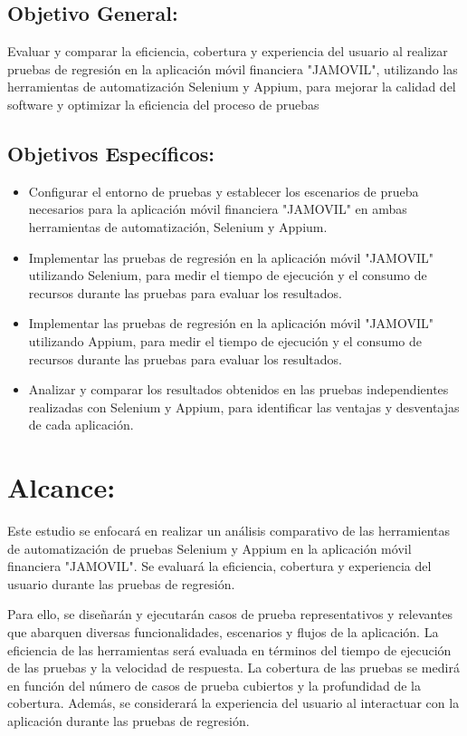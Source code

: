 \documentclass{article}
\begin{document}
\subsection*{Objetivo General:}
 Evaluar y comparar la eficiencia, cobertura y experiencia del usuario al realizar pruebas de regresión en la aplicación móvil financiera "JAMOVIL", utilizando las herramientas de automatización Selenium y Appium, para mejorar la calidad del software y optimizar la eficiencia del proceso de pruebas
\subsection*{Objetivos Específicos:}

\begin{itemize}
    \item Configurar el entorno de pruebas y establecer los escenarios de prueba necesarios para la aplicación móvil financiera "JAMOVIL" en ambas herramientas de automatización, Selenium y Appium.
    \item Implementar las pruebas de regresión en la aplicación móvil "JAMOVIL" utilizando Selenium, para medir el tiempo de ejecución y el consumo de recursos durante las pruebas para evaluar los resultados.
    \item Implementar las pruebas de regresión en la aplicación móvil "JAMOVIL" utilizando Appium, para medir el tiempo de ejecución y el consumo de recursos durante las pruebas para evaluar los resultados.
    \item Analizar y comparar los resultados obtenidos en las pruebas independientes realizadas con Selenium y Appium, para identificar las ventajas y desventajas de cada aplicación.
\end{itemize}

\section{Alcance:}

Este estudio se enfocará en realizar un análisis comparativo de las herramientas de automatización de pruebas Selenium y Appium en la aplicación móvil financiera "JAMOVIL". Se evaluará la eficiencia, cobertura y experiencia del usuario durante las pruebas de regresión.

Para ello, se diseñarán y ejecutarán casos de prueba representativos y relevantes que abarquen diversas funcionalidades, escenarios y flujos de la aplicación. La eficiencia de las herramientas será evaluada en términos del tiempo de ejecución de las pruebas y la velocidad de respuesta. La cobertura de las pruebas se medirá en función del número de casos de prueba cubiertos y la profundidad de la cobertura. Además, se considerará la experiencia del usuario al interactuar con la aplicación durante las pruebas de regresión.
\end{document}
